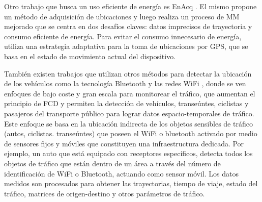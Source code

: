 Otro trabajo que busca un uso eficiente de energía es EnAcq \cite{fang2011enacq}. El mismo propone un método de adquisición de ubicaciones y luego realiza un proceso de MM mejorado que se centra en dos desafíos claves: datos imprecisos de trayectoria y consumo eficiente de energía. Para evitar el consumo innecesario de energía, utiliza una estrategia adaptativa para la toma de ubicaciones por GPS, que se basa en el estado de movimiento actual del dispositivo.

También existen trabajos que utilizan otros métodos para detectar la ubicación de los vehículos como la tecnología Bluetooth y las redes WiFi \cite{ruppe2012augmenting}, donde se ven enfoques de bajo coste y gran escala para monitorear el tráfico, que aumentan el principio de FCD y permiten la detección de vehículos, transeúntes, ciclistas y pasajeros del transporte público para lograr datos espacio-temporales de tráfico. Este enfoque se basa en la ubicación indirecta de los objetos sensibles de tráfico (autos, ciclistas. transeúntes) que poseen el WiFi o bluetooth activado por medio de sensores fijos y móviles que constituyen una infraestructura dedicada. Por ejemplo, un auto que está equipado con receptores específicos, detecta todos los objetos de tráfico que están dentro de un área a través del número de identificación de WiFi o Bluetooth, actuando como sensor móvil. Los datos medidos son procesados para obtener las trayectorias, tiempo de viaje, estado del tráfico, matrices de origen-destino y otros parámetros de tráfico.
